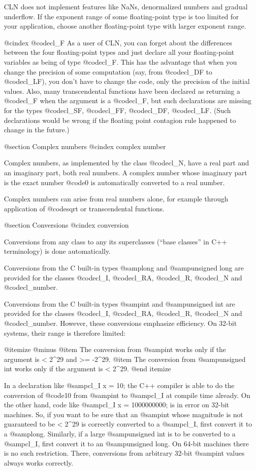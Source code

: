CLN does not implement features like NaNs, denormalized numbers and
gradual underflow. If the exponent range of some floating-point type
is too limited for your application, choose another floating-point type
with larger exponent range.

@cindex @code{cl_F}
As a user of CLN, you can forget about the differences between the
four floating-point types and just declare all your floating-point
variables as being of type @code{cl_F}. This has the advantage that
when you change the precision of some computation (say, from @code{cl_DF}
to @code{cl_LF}), you don't have to change the code, only the precision
of the initial values. Also, many transcendental functions have been
declared as returning a @code{cl_F} when the argument is a @code{cl_F},
but such declarations are missing for the types @code{cl_SF}, @code{cl_FF},
@code{cl_DF}, @code{cl_LF}. (Such declarations would be wrong if
the floating point contagion rule happened to change in the future.)


@section Complex numbers
@cindex complex number

Complex numbers, as implemented by the class @code{cl_N}, have a real
part and an imaginary part, both real numbers. A complex number whose
imaginary part is the exact number @code{0} is automatically converted
to a real number.

Complex numbers can arise from real numbers alone, for example
through application of @code{sqrt} or transcendental functions.


@section Conversions
@cindex conversion

Conversions from any class to any its superclasses (``base classes'' in
C++ terminology) is done automatically.

Conversions from the C built-in types @samp{long} and @samp{unsigned long}
are provided for the classes @code{cl_I}, @code{cl_RA}, @code{cl_R},
@code{cl_N} and @code{cl_number}.

Conversions from the C built-in types @samp{int} and @samp{unsigned int}
are provided for the classes @code{cl_I}, @code{cl_RA}, @code{cl_R},
@code{cl_N} and @code{cl_number}. However, these conversions emphasize
efficiency. On 32-bit systems, their range is therefore limited:

@itemize @minus
@item
The conversion from @samp{int} works only if the argument is < 2^29 and >= -2^29.
@item
The conversion from @samp{unsigned int} works only if the argument is < 2^29.
@end itemize

In a declaration like @samp{cl_I x = 10;} the C++ compiler is able to
do the conversion of @code{10} from @samp{int} to @samp{cl_I} at compile time
already. On the other hand, code like @samp{cl_I x = 1000000000;} is
in error on 32-bit machines.
So, if you want to be sure that an @samp{int} whose magnitude is not guaranteed
to be < 2^29 is correctly converted to a @samp{cl_I}, first convert it to a
@samp{long}. Similarly, if a large @samp{unsigned int} is to be converted to a
@samp{cl_I}, first convert it to an @samp{unsigned long}. On 64-bit machines
there is no such restriction. There, conversions from arbitrary 32-bit @samp{int}
values always works correctly.

